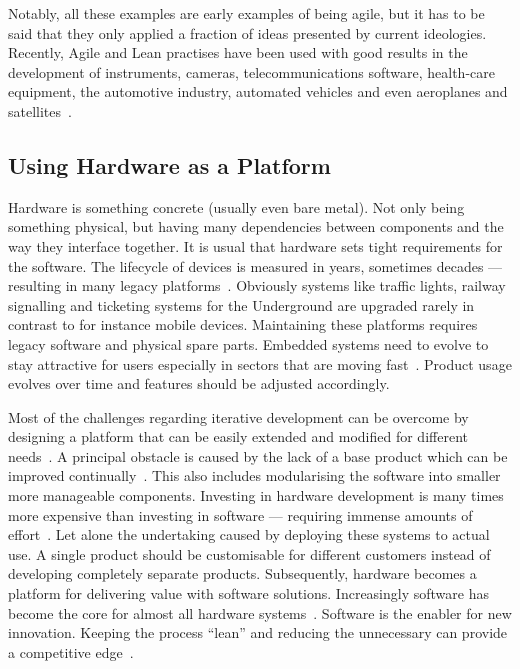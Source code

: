 \documentclass[english]{tktltiki2}
\begin{document}
Notably, all these examples are early examples of being agile, but it has to be said that they only applied a fraction of ideas presented by current ideologies. Recently, Agile and Lean practises have been used with good results in the development of instruments, cameras, telecommunications software, health-care equipment, the automotive industry, automated vehicles and even aeroplanes and satellites~\cite{RA03, VB09, BE12, KRM13, HB14}.

\subsection{Using Hardware as a Platform}

Hardware is something concrete (usually even bare metal). Not only being something physical, but having many dependencies between components and the way they interface together. It is usual that hardware sets tight requirements for the software. The lifecycle of devices is measured in years, sometimes decades — resulting in many legacy platforms~\cite{BE12}. Obviously systems like traffic lights, railway signalling and ticketing systems for the Underground are upgraded rarely in contrast to for instance mobile devices. Maintaining these platforms requires legacy software and physical spare parts. Embedded systems need to evolve to stay attractive for users especially in sectors that are moving fast~\cite{BE12}. Product usage evolves over time and features should be adjusted accordingly.

Most of the challenges regarding iterative development can be overcome by designing a platform that can be easily extended and modified for different needs~\cite{KRM13}. A principal obstacle is caused by the lack of a base product which can be improved continually~\cite{HAB12}. This also includes modularising the software into smaller more manageable components. Investing in hardware development is many times more expensive than investing in software — requiring immense amounts of effort~\cite{BE12}. Let alone the undertaking caused by deploying these systems to actual use. A single product should be customisable for different customers instead of developing completely separate products. Subsequently, hardware becomes a platform for delivering value with software solutions. Increasingly software has become the core for almost all hardware systems~\cite{BE12}. Software is the enabler for new innovation. Keeping the process “lean” and reducing the unnecessary can provide a competitive edge~\cite{CWR10}.
\end{document}
